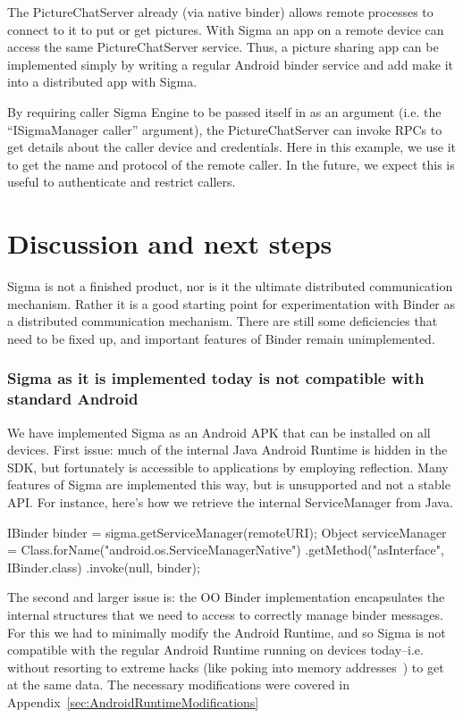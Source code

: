 \documentclass[prodmode]{acmlarge}
\begin{document}
The PictureChatServer already (via native binder) allows remote processes to connect to it to put or get pictures. With Sigma an app on a remote device can access the same PictureChatServer service. Thus, a picture sharing app can be implemented simply by writing a regular Android binder service and add make it into a distributed app with Sigma.

By requiring caller Sigma Engine to be passed itself in as an argument (i.e. the ``ISigmaManager caller'' argument), the PictureChatServer can invoke RPCs to get details about the caller device and credentials. Here in this example, we use it to get the name and protocol of the remote caller. In the future, we expect this is useful to authenticate and restrict callers.

\section{Discussion and next steps}
\label{sec:Discussion}
Sigma is not a finished product, nor is it the ultimate distributed communication mechanism. Rather it is a good starting point for experimentation with Binder as a distributed communication mechanism. There are still some deficiencies that need to be fixed up, and important features of Binder remain unimplemented.

\subsubsection{Sigma as it is implemented today is not compatible with standard Android}
We have implemented Sigma as an Android APK that can be installed on all devices. First issue: much of the internal Java Android Runtime is hidden in the SDK, but fortunately is accessible to applications by employing reflection. Many features of Sigma are implemented this way, but is unsupported and not a stable API. For instance, here's how we retrieve the internal ServiceManager from Java.

\begin{snippet}
IBinder binder = sigma.getServiceManager(remoteURI);
Object serviceManager = Class.forName("android.os.ServiceManagerNative")
                    .getMethod("asInterface", IBinder.class)
                    .invoke(null, binder);
\end{snippet}

The second and larger issue is: the OO Binder implementation encapsulates the internal structures that we need to access to correctly manage binder messages. For this we had to minimally modify the Android Runtime, and so Sigma is not compatible with the regular Android Runtime running on devices today--i.e. without resorting to extreme hacks (like poking into memory addresses~\cite{FacebookDalvikHacks}) to get at the same data. The necessary modifications were covered in Appendix~\ref{sec:AndroidRuntimeModifications}
\end{document}
